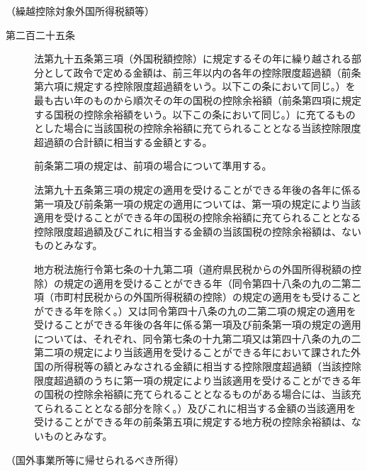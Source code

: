 \documentclass[twocolumn,a4j,10pt]{ltjtarticle}
\begin{document}
\noindent\hspace{10pt}（繰越控除対象外国所得税額等）
\begin{description}
\item[第二百二十五条]法第九十五条第三項（外国税額控除）に規定するその年に繰り越される部分として政令で定める金額は、前三年以内の各年の控除限度超過額（前条第六項に規定する控除限度超過額をいう。以下この条において同じ。）を最も古い年のものから順次その年の国税の控除余裕額（前条第四項に規定する国税の控除余裕額をいう。以下この条において同じ。）に充てるものとした場合に当該国税の控除余裕額に充てられることとなる当該控除限度超過額の合計額に相当する金額とする。
\item[]前条第二項の規定は、前項の場合について準用する。
\item[]法第九十五条第三項の規定の適用を受けることができる年後の各年に係る第一項及び前条第一項の規定の適用については、第一項の規定により当該適用を受けることができる年の国税の控除余裕額に充てられることとなる控除限度超過額及びこれに相当する金額の当該国税の控除余裕額は、ないものとみなす。
\item[]地方税法施行令第七条の十九第二項（道府県民税からの外国所得税額の控除）の規定の適用を受けることができる年（同令第四十八条の九の二第二項（市町村民税からの外国所得税額の控除）の規定の適用をも受けることができる年を除く。）又は同令第四十八条の九の二第二項の規定の適用を受けることができる年後の各年に係る第一項及び前条第一項の規定の適用については、それぞれ、同令第七条の十九第二項又は第四十八条の九の二第二項の規定により当該適用を受けることができる年において課された外国の所得税等の額とみなされる金額に相当する控除限度超過額（当該控除限度超過額のうちに第一項の規定により当該適用を受けることができる年の国税の控除余裕額に充てられることとなるものがある場合には、当該充てられることとなる部分を除く。）及びこれに相当する金額の当該適用を受けることができる年の前条第五項に規定する地方税の控除余裕額は、ないものとみなす。
\end{description}
\noindent\hspace{10pt}（国外事業所等に帰せられるべき所得）
\end{document}
